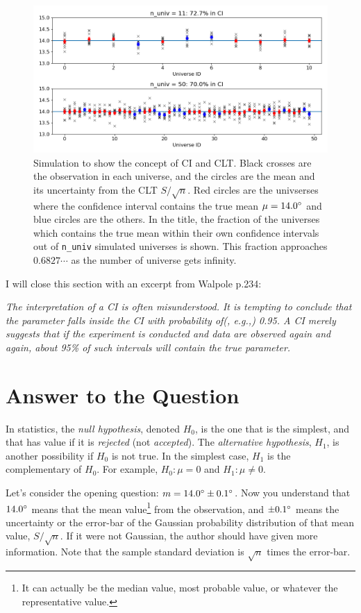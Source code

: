 \begin{figure}[ht!]
  \centering
  \includegraphics[width=1\linewidth]{figs/fig_clt01}
  \caption{Simulation to show the concept of CI and CLT. Black crosses are the observation in each universe, and the circles are the mean and its uncertainty from the CLT $ S / \sqrt{n} $. Red circles are the univserses where the confidence interval contains the true mean $ \mu = \m{14.0} $ and blue circles are the others. In the title, the fraction of the universes which contains the true mean within their own confidence intervals out of \texttt{n\_univ} simulated universes is shown. This fraction approaches $ 0.6827\cdots $ as the number of universe gets infinity.}
  \label{fig:figclt01}
\end{figure}

I will close this section with an excerpt from Walpole p.234:

\textit{The interpretation of a CI is often misunderstood. It is tempting to conclude that the parameter falls inside the CI with probability of(, e.g.,) 0.95. A CI merely suggests that if the experiment is conducted and data are observed again and again, about 95\% of such intervals will contain the true parameter.}



\section{Answer to the Question}
In statistics, the \textit{null hypothesis}, denoted $ H_0 $, is the one that is the simplest, and that has value if it is \textit{rejected} (not \textit{accepted}). The \textit{alternative hypothesis}, $ H_1 $, is another possibility if $ H_0 $ is not true. In the simplest case, $ H_1 $ is the complementary of $ H_0 $. For example, $ H_0: \mu = 0 $ and $ H_1: \mu \neq 0 $. 

Let's consider the opening question: $ m = \m{14.0} \pm \m{0.1} $. Now you understand that $ \m{14.0} $ means that the mean value\footnote{It can actually be the median value, most probable value, or whatever the representative value.} from the observation, and $ \pm \m{0.1} $ means the uncertainty or the error-bar of the Gaussian probability distribution of that mean value, $ S / \sqrt{n} $. If it were not Gaussian, the author should have given more information. Note that the sample standard deviation is $ \sqrt{n} $ times the error-bar.

